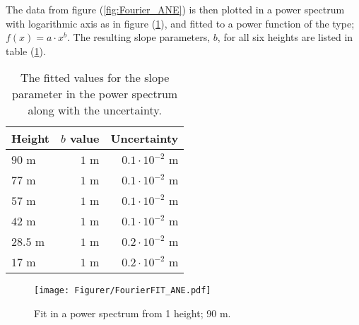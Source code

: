 
The data from figure (\ref{fig:Fourier_ANE}) is then plotted in a power spectrum with logarithmic axis  as in figure (\ref{fig:FourierFIT_ANE}), and fitted to a power function of the type; $f(x) = a \cdot x^{b}$. The resulting slope parameters, $b$, for all six heights are listed in table (\ref{tab:RES_ANE}).


\begin{table}[htbp!]
  \centering
  \begin{tabular}{lrr}
    \hline
    \hline
    Height           &$b$ value     &Uncertainty      \\
    \hline
    $90 $ m         &$1$ m      &$0.1\cdot 10^{-2}$ m       \\
    $77 $ m          &$1$ m     &$0.1\cdot 10^{-2}$ m         \\
    $57 $ m          &$1$ m     &$0.1\cdot 10^{-2}$ m         \\
    $42 $ m          &$1$ m    &$0.1\cdot 10^{-2}$ m         \\
    $28.5 $ m          &$1$ m      &$0.2\cdot 10^{-2}$ m         \\
    $17 $ m          &$1$ m      &$0.2\cdot 10^{-2}$ m         \\
    \hline
    \hline
  \end{tabular}
  \caption{The fitted values for the slope parameter in the power spectrum along with the uncertainty.}
  \label{tab:RES_ANE}
\end{table}

\begin{figure}
\centering
\texttt{[image: Figurer/FourierFIT\_ANE.pdf]}
\caption{Fit in a power spectrum from 1 height; 90 m.}
\label{fig:FourierFIT_ANE}
\end{figure}